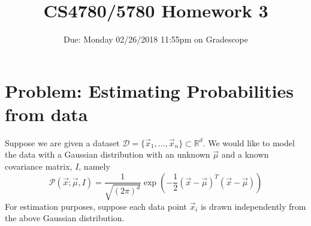 \documentclass[11pt]{article}
\title{CS4780/5780 Homework 3}
\author{Due: Monday 02/26/2018 11:55pm on Gradescope}
\date{}
\begin{document}
	
	\maketitle
		\section*{Problem: Estimating Probabilities from data}
		Suppose we are given a dataset $\mathcal{D} = \{\vec{x}_1,  ..., \vec{x}_n\}\subset \mathbb{R}^d$. We would like to model the data with a Gaussian distribution with an unknown $\vec{\mu}$ and a known covariance matrix, $I$, namely  $$\mathcal{P}(\vec{x} ; \vec{\mu}, I) = \frac{1}{\sqrt{(2\pi)^{d}}} \exp (-\frac{1}{2} (\vec{x} - \vec{\mu})^T (\vec{x} - \vec{\mu}))$$
		For estimation purposes, suppose each data point $\vec{x}_i$ is drawn independently from the above Gaussian distribution.
\end{document}
